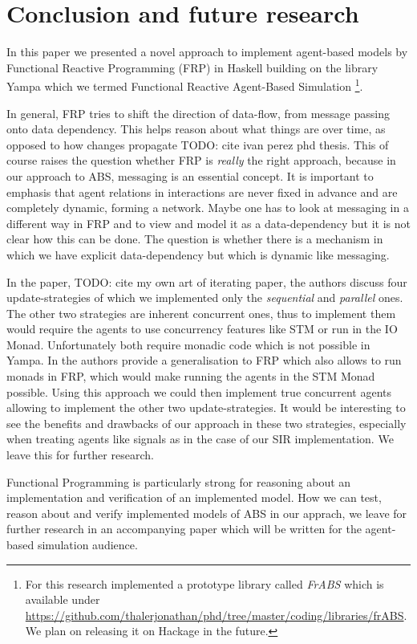 \section{Conclusion and future research}
In this paper we presented a novel approach to implement agent-based models by Functional Reactive Programming (FRP) in Haskell building on the library Yampa which we termed Functional Reactive Agent-Based Simulation \footnote{For this research implemented a prototype library called \textit{FrABS} which is available under \url{https://github.com/thalerjonathan/phd/tree/master/coding/libraries/frABS}. We plan on releasing it on Hackage in the future.}.

In general, FRP tries to shift the direction of data-flow, from message passing onto data dependency. This helps reason about what things are over time, as opposed to how changes propagate TODO: cite ivan perez phd thesis. This of course raises the question whether FRP is \textit{really} the right approach, because in our approach to ABS, messaging is an essential concept. It is important to emphasis that agent relations in interactions are never fixed in advance and are completely dynamic, forming a network. Maybe one has to look at messaging in a different way in FRP and to view and model it as a data-dependency but it is not clear how this can be done. The question is whether there is a mechanism in which we have explicit data-dependency but which is dynamic like messaging.

In the paper, TODO: cite my own art of iterating paper, the authors discuss four update-strategies of which we implemented only the \textit{sequential} and \textit{parallel} ones. The other two strategies are inherent concurrent ones, thus to implement them would require the agents to use concurrency features like STM or run in the IO Monad. Unfortunately both require monadic code which is not possible in Yampa. In \cite{perez_functional_2016} the authors provide a generalisation to FRP which also allows to run monads in FRP, which would make running the agents in the STM Monad possible. Using this approach we could then implement true concurrent agents allowing to implement the other two update-strategies. It would be interesting to see the benefits and drawbacks of our approach in these two strategies, especially when treating agents like signals as in the case of our SIR implementation. We leave this for further research.

Functional Programming is particularly strong for reasoning about an implementation and verification of an implemented model. How we can test, reason about and verify implemented models of ABS in our apprach, we leave for further research in an accompanying paper which will be written for the agent-based simulation audience.